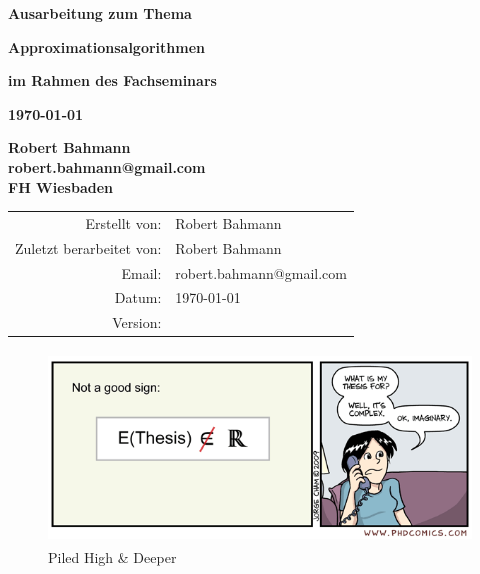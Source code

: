 \documentclass[12pt, a4paper, twoside]{scrartcl}
\date
\begin{document}
\pagestyle{empty}
\begin{titlepage}
	
	\vspace{60pt} 
	\begin{center}
		\vspace{20pt} \textbf{\Large Ausarbeitung zum Thema}
		
		\vspace{20pt} \textbf{\Huge Approximationsalgorithmen}
		
		\vspace{20pt} \textbf{\Large im Rahmen des Fachseminars}
		
		\vspace{20pt} \textbf{\today}
		
		\vspace{20pt} \textbf{Robert Bahmann}\\
		\textbf{robert.bahmann@gmail.com}\\
		\textbf{FH Wiesbaden}\\
		
		\vfill \vspace{20pt} 
		\begin{tabular}
			[t]{rl} Erstellt von: & {Robert Bahmann}\\
			Zuletzt berarbeitet von: & {Robert Bahmann}\\
			Email: & {robert.bahmann@gmail.com}\\
			Datum: & {\today}\\
			Version: & {\svnInfoRevision}\\
			
		\end{tabular}
	\end{center}
	\newpage 
\end{titlepage}

\thispagestyle{empty} \vspace{0.3
\textheight} 
\begin{figure}
	[htbp] \centering 
	\includegraphics[height=2in]{img/e_thesis_not_in_real.png} \caption{Piled High \& Deeper ~\cite{phd}} \label{fig:img_phd052709s} 
\end{figure}
\end{document}
